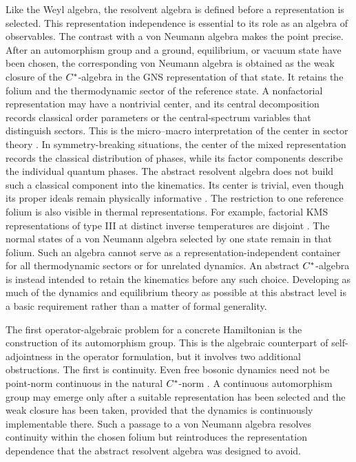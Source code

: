 \documentclass[11pt,a4paper]{article}
\theoremstyle{plain}
\theoremstyle{definition}
\theoremstyle{remark}
\begin{document}
Like the Weyl algebra, the resolvent algebra is defined before a representation is selected. This representation independence is essential to its role as an algebra of observables. The contrast with a von Neumann algebra makes the point precise. After an automorphism group and a ground, equilibrium, or vacuum state have been chosen, the corresponding von Neumann algebra is obtained as the weak closure of the \(C^{\ast}\)-algebra in the GNS representation of that state. It retains the folium and the thermodynamic sector of the reference state. A nonfactorial representation may have a nontrivial center, and its central decomposition records classical order parameters or the central-spectrum variables that distinguish sectors. This is the micro--macro interpretation of the center in sector theory \cite{IzumiOjima002}. In symmetry-breaking situations, the center of the mixed representation records the classical distribution of phases, while its factor components describe the individual quantum phases. The abstract resolvent algebra does not build such a classical component into the kinematics. Its center is trivial, even though its proper ideals remain physically informative \cite[Theorem 4.10]{BuchholzGrundling002}. The restriction to one reference folium is also visible in thermal representations. For example, factorial KMS representations of type III at distinct inverse temperatures are disjoint \cite[Theorem 5.3.35]{BratteliRobinson004}. The normal states of a von Neumann algebra selected by one state remain in that folium. Such an algebra cannot serve as a representation-independent container for all thermodynamic sectors or for unrelated dynamics. An abstract \(C^{\ast}\)-algebra is instead intended to retain the kinematics before any such choice. Developing as much of the dynamics and equilibrium theory as possible at this abstract level is a basic requirement rather than a matter of formal generality.

The first operator-algebraic problem for a concrete Hamiltonian is the construction of its automorphism group. This is the algebraic counterpart of self-adjointness in the operator formulation, but it involves two additional obstructions. The first is continuity. Even free bosonic dynamics need not be point-norm continuous in the natural \(C^{\ast}\)-norm \cite[Section 7.1]{BuchholzGrundling002}. A continuous automorphism group may emerge only after a suitable representation has been selected and the weak closure has been taken, provided that the dynamics is continuously implementable there. Such a passage to a von Neumann algebra resolves continuity within the chosen folium but reintroduces the representation dependence that the abstract resolvent algebra was designed to avoid.
\end{document}
